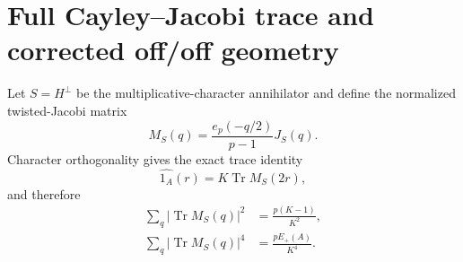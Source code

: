\section{Full Cayley--Jacobi trace and corrected off/off geometry}

Let $S=H^\perp$ be the multiplicative-character annihilator and define the
normalized twisted-Jacobi matrix
\[
M_S(q)=\frac{e_p(-q/2)}{p-1}J_S(q).
\]
Character orthogonality gives the exact trace identity
\begin{equation}\label{eq:jacobi}
\widehat{1_A}(r)=K\operatorname{Tr}M_S(2r),
\end{equation}
and therefore
\begin{align}
\sum_q|\operatorname{Tr}M_S(q)|^2&=\frac{p(K-1)}{K^2},\label{eq:trace2}\\
\sum_q|\operatorname{Tr}M_S(q)|^4&=\frac{pE_+(A)}{K^4}.\label{eq:trace4}
\end{align}
